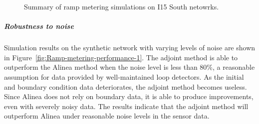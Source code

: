 								\begin{figure}
									\hfill{}
									\caption{Summary of ramp metering simulations on I15 South netowrks.}
								\end{figure}
																
																
																
								\subparagraph{Robustness to noise}
																
								Simulation results on the synthetic network with varying levels of
								noise are shown in Figure~\ref{fig:Ramp-metering-performance-1}.
								The adjoint method is able to outperform the Alinea method when the
								noise level is less than 80\%, a reasonable assumption for data provided
								by well-maintained loop detectors. As the initial and boundary condition
								data deteriorates, the adjoint method becomes useless. Since Alinea
								does not rely on boundary data, it is able to produce improvements,
								even with severely noisy data. The results indicate that the adjoint
								method will outperform Alinea under reasonable noise levels in the
								sensor data.
